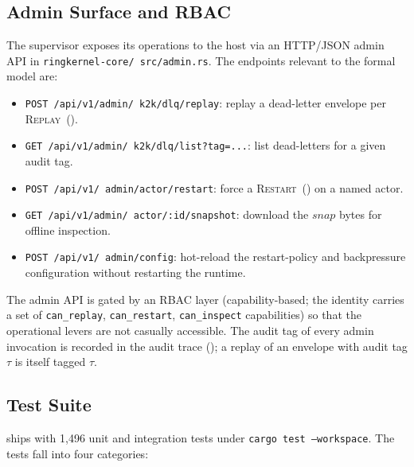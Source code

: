 \subsection{Admin Surface and RBAC}
\label{sec:implementation:admin}

The supervisor exposes its operations to the host via an HTTP/JSON
admin API in \texttt{ringkernel-\allowbreak core/\allowbreak
src/admin.rs}.  The endpoints relevant to the formal model are:

\begin{itemize}
\item \texttt{POST\ /api/\allowbreak v1/\allowbreak admin/\allowbreak
k2k/\allowbreak dlq/\allowbreak replay}: replay a dead-letter
envelope per \textsc{Replay}~().
\item \texttt{GET\ /api/\allowbreak v1/\allowbreak admin/\allowbreak
k2k/\allowbreak dlq/\allowbreak list?tag=...}: list
dead-letters for a given audit tag.
\item \texttt{POST\ /api/\allowbreak v1/\allowbreak
admin/\allowbreak actor/\allowbreak restart}: force a
\textsc{Restart}~() on a named actor.
\item \texttt{GET\ /api/\allowbreak v1/\allowbreak admin/\allowbreak
actor/:id/\allowbreak snapshot}: download the
\(\mathit{snap}\) bytes for offline inspection.
\item \texttt{POST\ /api/\allowbreak v1/\allowbreak
admin/\allowbreak config}: hot-reload the restart-policy and
backpressure configuration without restarting the runtime.
\end{itemize}

The admin API is gated by an RBAC layer (capability-based; the
identity carries a set of \texttt{can\_replay},
\texttt{can\_restart}, \texttt{can\_inspect} capabilities) so that
the operational levers are not casually accessible.  The audit tag
of every admin invocation is recorded in the audit trace
(); a replay of an envelope with audit tag
\(\tau\) is itself tagged \(\tau\).

\subsection{Test Suite}
\label{sec:implementation:tests}

\system{} ships with 1{,}496 unit and integration tests under
\texttt{cargo test --workspace}.  The tests fall into four
categories:

